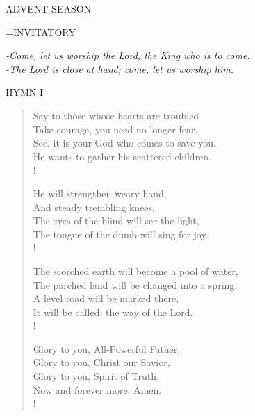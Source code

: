 \begin{center}\normalsize ADVENT SEASON\\
\end{center}

\hangindent=\parindent \small{INVITATORY}
\begin{center}
\textit{-Come, let us worship the Lord, the King who is to come.\\}
\textit{-The Lord is close at hand; come, let us worship him.\\}
\end{center}

\noindent\small{\uppercase{Hymn I}}\normalsize\label{advent:firstHymn}
\begin{verse}
Say to those whose hearts are troubled\\
Take courage, you need no longer fear.\\
See, it is your God who comes to save you,\\
He wants to gather his scattered children.\\!

He will strengthen weary hand,\\
And steady trembling knees,\\
The eyes of the blind will see the light,\\
The tongue of the dumb will sing for joy.\\!

The scorched earth will become a pool of water,\\
The parched land will be changed into a spring.\\
A level road will be marked there,\\
It will be called: the way of the Lord.\\!

Glory to you, All-Powerful Father,\\
Glory to you, Christ our Savior,\\
Glory to you, Spirit of Truth,\\
Now and forever more. Amen.\\!
\end{verse}

